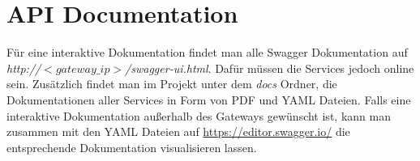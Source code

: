 \section{API Documentation}
Für eine interaktive Dokumentation findet man alle Swagger Dokumentation auf \textit{http://$<gateway\_ip>$/swagger-ui.html}. Dafür müssen die Services jedoch online sein. Zusätzlich findet man im Projekt unter dem \textit{docs} Ordner, die Dokumentationen aller Services in Form von PDF und YAML Dateien. Falls eine interaktive Dokumentation außerhalb des Gateways gewünscht ist, kann man zusammen mit den YAML Dateien auf \href{https://editor.swagger.io/}{https://editor.swagger.io/} die entsprechende Dokumentation visualisieren lassen. 
